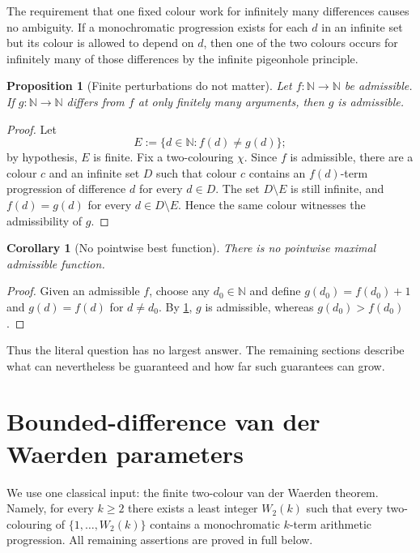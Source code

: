 \documentclass[11pt]{article}
\newtheorem{proposition}[theorem]{Proposition}
\newtheorem{corollary}[theorem]{Corollary}
\theoremstyle{definition}
\theoremstyle{remark}
\newcommand{\N}{\mathbb N}
\newcommand{\col}{\chi}
\begin{document}
The requirement that one fixed colour work for infinitely many differences causes no ambiguity. If a monochromatic progression exists for each $d$ in an infinite set but its colour is allowed to depend on $d$, then one of the two colours occurs for infinitely many of those differences by the infinite pigeonhole principle.

\begin{proposition}[Finite perturbations do not matter]\label{prop:finite-perturbation}
Let $f\colon\N\to\N$ be admissible. If $g\colon\N\to\N$ differs from $f$ at only finitely many arguments, then $g$ is admissible.
\end{proposition}

\begin{proof}
Let
\[
E:=\{d\in\N:f(d)\ne g(d)\};
\]
by hypothesis, $E$ is finite. Fix a two-colouring $\col$. Since $f$ is admissible, there are a colour $c$ and an infinite set $D$ such that colour $c$ contains an $f(d)$-term progression of difference $d$ for every $d\in D$. The set $D\setminus E$ is still infinite, and $f(d)=g(d)$ for every $d\in D\setminus E$. Hence the same colour witnesses the admissibility of $g$.
\end{proof}

\begin{corollary}[No pointwise best function]\label{cor:no-pointwise-best}
There is no pointwise maximal admissible function.
\end{corollary}

\begin{proof}
Given an admissible $f$, choose any $d_0\in\N$ and define $g(d_0)=f(d_0)+1$ and $g(d)=f(d)$ for $d\ne d_0$. By \cref{prop:finite-perturbation}, $g$ is admissible, whereas $g(d_0)>f(d_0)$.
\end{proof}

Thus the literal question has no largest answer. The remaining sections describe what can nevertheless be guaranteed and how far such guarantees can grow.

\section{Bounded-difference van der Waerden parameters}

We use one classical input: the finite two-colour van der Waerden theorem. Namely, for every $k\ge2$ there exists a least integer $W_2(k)$ such that every two-colouring of $\{1,\ldots,W_2(k)\}$ contains a monochromatic $k$-term arithmetic progression. All remaining assertions are proved in full below.
\end{document}
